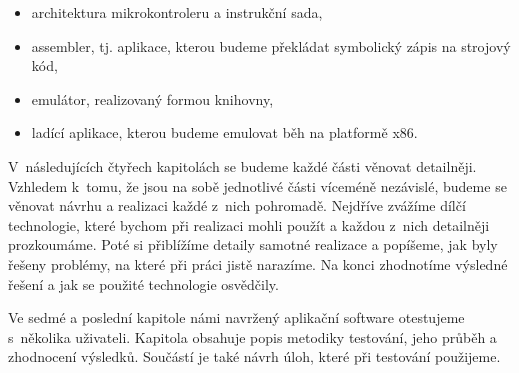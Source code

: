 \begin{introduction}
\begin{itemize}
	\item architektura mikrokontroleru a instrukční sada,
	\item assembler, tj. aplikace, kterou budeme překládat symbolický zápis na strojový kód,
	\item emulátor, realizovaný formou knihovny,
	\item ladící aplikace, kterou budeme emulovat běh na platformě x86.
\end{itemize}

V~následujících čtyřech kapitolách se budeme každé části věnovat detailněji. Vzhledem k~tomu, že jsou na sobě jednotlivé části víceméně nezávislé, budeme se věnovat návrhu a realizaci každé z~nich pohromadě. Nejdříve zvá\-ží\-me dílčí technologie, které bychom při realizaci mohli použít a každou z~nich detailněji prozkoumáme. Poté si přiblížíme detaily samotné realizace a po\-pí\-še\-me, jak byly řešeny problémy, na které při práci jistě narazíme. Na konci zhodnotíme výsledné řešení a jak se použité technologie osvědčily.

Ve sedmé a poslední kapitole námi navržený aplikační software otestujeme s~několika uživateli. Kapitola obsahuje popis metodiky testování, jeho průběh a zhodnocení výsledků. Součástí je také návrh úloh, které při testování použijeme.

\end{introduction}
